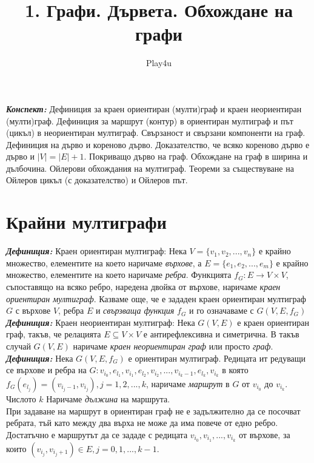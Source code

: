 \documentclass[11pt]{article} %
\title{1. Графи. Дървета. Обхождане на графи}
\author{Play4u}
\newcommand{\graph}{G(V, E, f_{G})}
\newcommand{\italicBold}[1]{\textbf{\emph{#1}}}
\newcommand{\definition}{\italicBold{Дефиниция: }}
\newcommand{\curlies}[1]{\{#1\}}
\begin{document}
\maketitle

\italicBold{Конспект:} Дефиниция за краен ориентиран (мулти)граф и краен неориентиран (мулти)граф. Дефиниция за маршрут (контур) в ориентиран мултиграф и път (цикъл) в неориентиран мултиграф. Свързаност и свързани компоненти на граф. Дефиниция на дърво и кореново дърво. Доказателство, че всяко кореново дърво е дърво и $|V| = |E|+1$. Покриващо дърво на граф. Обхождане на граф в ширина и дълбочина. Ойлерови обхождания на мултиграф. Теореми за съществуване на Ойлеров цикъл (с доказателство) и Ойлеров път. 

\section{Крайни мултиграфи}

\qquad\definition Краен ориентиран мултиграф: Нека $V = \curlies{v_{1}, v_{2}, ..., v_{n}}$ е крайно множество, елементите на което наричаме \textit{върхове}, а $E = \curlies{e_{1}, e_{2}, ..., e_{m}}$ е крайно множество, елементите на което наричаме \textit{ребра}. Функцията $f_{G} : E \to V \times V$, съпоставящо на всяко ребро, наредена двойка от върхове, наричаме \textit{краен ориентиран мултиграф}. Казваме още, че е зададен краен ориентиран мултиграф $G$ с върхове $V$, ребра $E$ и \textit{свързваща функция} $f_{G}$ и го означаваме с $\graph$\\

\definition Краен неориентиран мултиграф: Нека $G(V, E)$ е краен ориентиран граф, такъв, че релацията $E \subseteq V \times V$ е антирефлексивна и симетрична. В такъв случай $G(V, E)$ наричаме \textit{краен неориентиран граф} или просто \textit{граф}.\\

\definition Нека $\graph$ е ориентиран мултиграф. Редицата ит редуващи се върхове и ребра на $G: v_{i_0}, e_{l_1}, v_{i_1}, e_{l_2}, v_{i_2}, ..., v_{i_k-1}, e_{l_k}, v_{i_k}$ в която $f_{G}(e_{l_j}) = (v_{i_j-1}, v_{i_j}), j = 1, 2, ..., k$, наричаме \textit{маршрут} в $G$ от $v_{i_0}$ до $v_{i_k}$. Числото $k$ Наричаме \textit{дължина} на маршрута.\\
При задаване на маршрут в ориентиран граф не е задължително да се посочват ребрата, тъй като между два върха не може да има повече от едно ребро. Достатъчно е маршрутът да се зададе с редицата $v_{i_0}, v_{i_1}, ..., v_{i_k}$ от върхове, за които $(v_{i_j}, v_{i_j+1})\in E, j = 0, 1, ..., k - 1$.\\
\end{document}
